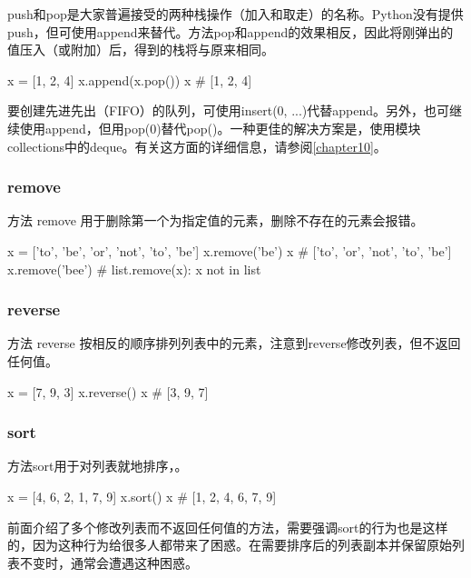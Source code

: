 push和pop是大家普遍接受的两种栈操作（加入和取走）的名称。Python没有提供push，但可使用append来替代。方法pop和append的效果相反，因此将刚弹出的值压入（或附加）后，得到的栈将与原来相同。

\begin{pyc}
x = [1, 2, 4]
x.append(x.pop())
x  # [1, 2, 4]
\end{pyc}

要创建先进先出（FIFO）的队列，可使用insert(0, ...)代替append。另外，也可继续使用append，但用pop(0)替代pop()。一种更佳的解决方案是，使用模块collections中的deque。有关这方面的详细信息，请参阅\autoref{chapter10}。

\subsubsection{remove}
方法 remove 用于删除第一个为指定值的元素，删除不存在的元素会报错。

\begin{pyc}
x = ['to', 'be', 'or', 'not', 'to', 'be']
x.remove('be')
x  # ['to', 'or', 'not', 'to', 'be']
x.remove('bee')  # list.remove(x): x not in list
\end{pyc}


\subsubsection{reverse}
方法 reverse 按相反的顺序排列列表中的元素，注意到reverse修改列表，但不返回任何值。

\begin{pyc}
x = [7, 9, 3]
x.reverse()
x  # [3, 9, 7]
\end{pyc}


\subsubsection{sort}
方法sort用于对列表就地排序，。

\begin{pyc}
x = [4, 6, 2, 1, 7, 9]
x.sort()
x  # [1, 2, 4, 6, 7, 9]
\end{pyc}

前面介绍了多个修改列表而不返回任何值的方法，需要强调sort的行为也是这样的，因为这种行为给很多人都带来了困惑。在需要排序后的列表副本并保留原始列表不变时，通常会遭遇这种困惑。

